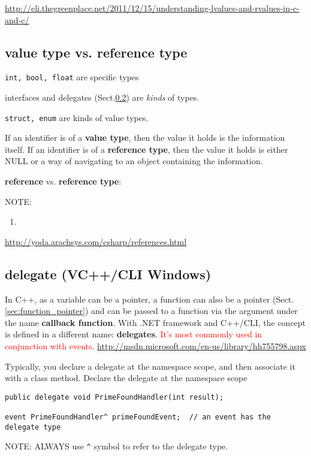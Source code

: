 \url{http://eli.thegreenplace.net/2011/12/15/understanding-lvalues-and-rvalues-in-c-and-c/}

\subsection{value type vs. reference type}

\begin{mdframed}
\verb!int, bool, float! are specific types

interfaces and delegates (Sect.\ref{sec:delegates}) are {\it kinds} of types. 

\verb!struct, enum! are kinds of value types.
\end{mdframed}

If an identifier is of a {\bf value type}, then the value it holds is the
information itself. If an identifier is of a {\bf reference type}, then the
value it holds is either NULL or a way of navigating to an object containing the
information.

{\bf reference} vs. {\bf reference type}:


NOTE: 
\begin{enumerate}
  \item 
\end{enumerate}

\url{http://yoda.arachsys.com/csharp/references.html}

\subsection{delegate (VC++/CLI Windows)}
\label{sec:delegates} 

In C++, as a variable can be a pointer, a function can also be a pointer
(Sect.\ref{sec:function_pointer}) and can be passed to a function via the
argument under the name {\bf callback function}. With .NET framework and
C++/CLI, the concept is defined in a different name: {\bf delegates}.
\textcolor{red}{It's most commonly used in conjunction with events}.
\url{http://msdn.microsoft.com/en-us/library/hh755798.aspx}

Typically, you declare a delegate at the namespace scope, and then
associate it with a class method. Declare the delegate at the namespace
scope
\begin{verbatim}
public delegate void PrimeFoundHandler(int result);

event PrimeFoundHandler^ primeFoundEvent;  // an event has the delegate type    
\end{verbatim}
NOTE: ALWAYS use \verb!^! symbol to refer to the delegate type.

